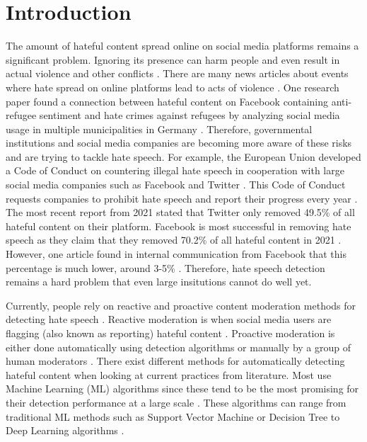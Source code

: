 \chapter{Introduction}
\newcommand{\customtextbox}[1]{
	\setlength{\fboxsep}{0.5em}
	\fbox{
		\begin{minipage}{\linewidth-1.7em}
			\vspace*{0.25em}
			#1
		\end{minipage}
	}
}

The amount of hateful content spread online on social media platforms remains a significant problem. Ignoring its presence can harm people and even result in actual violence and other conflicts \cite{ecri-hate-speech-and-violence, balayn2021automatic}. There are many news articles about events where hate spread on online platforms lead to acts of violence \cite{columbia-facebook-linked-to-violence, mujib-mashal-india, paul-mozur-2018, muller2021fanning}. One research paper found a connection between hateful content on Facebook containing anti-refugee sentiment and hate crimes against refugees by analyzing social media usage in multiple municipalities in Germany  \cite{muller2021fanning}. Therefore, governmental institutions and social media companies are becoming more aware of these risks and are trying to tackle hate speech. For example, the European Union developed a Code of Conduct on countering illegal hate speech in cooperation with large social media companies such as Facebook and Twitter \cite{eu-code-of-conduct}. This Code of Conduct requests companies to prohibit hate speech and report their progress every year \cite{eu-code-of-conduct}. The most recent report from 2021 stated that Twitter only removed 49.5\% of all hateful content on their platform. Facebook is most successful in removing hate speech as they claim that they removed 70.2\% of all hateful content in 2021 \cite{eu-code-of-conduct}. However, one article found in internal communication from Facebook that this percentage is much lower, around 3-5\% \cite{noah2021giansiracusa}. Therefore, hate speech detection remains a hard problem that even large insitutions cannot do well yet.

Currently, people rely on reactive and proactive content moderation methods for detecting hate speech \cite{klonick2017new}. Reactive moderation is when social media users are flagging (also known as reporting) hateful content \cite{klonick2017new}. Proactive moderation is either done automatically using detection algorithms or manually by a group of human moderators \cite{klonick2017new}. There exist different methods for automatically detecting hateful content when looking at current practices from literature. Most use Machine Learning (ML) algorithms since these tend to be the most promising for their detection performance at a large scale \cite{balayn2021automatic, fortuna2018survey}. These algorithms can range from traditional ML methods such as Support Vector Machine or Decision Tree to Deep Learning algorithms \cite{fortuna2018survey}.

